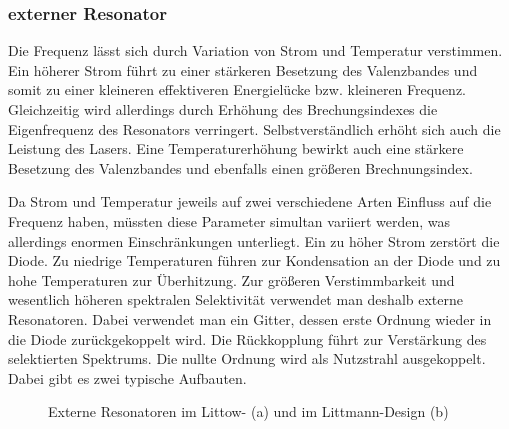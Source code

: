 \subsubsection{externer Resonator}\label{subsubsec:externer_resonator}
Die Frequenz lässt sich durch Variation von Strom und Temperatur verstimmen. Ein
höherer Strom führt zu einer stärkeren Besetzung des Valenzbandes und somit zu
einer kleineren effektiveren Energielücke bzw. kleineren Frequenz. Gleichzeitig
wird allerdings durch Erhöhung des Brechungsindexes die Eigenfrequenz des
Resonators verringert. Selbstverständlich erhöht sich auch die Leistung des
Lasers. Eine Temperaturerhöhung bewirkt auch eine stärkere Besetzung des
Valenzbandes und ebenfalls einen größeren Brechnungsindex.\par
Da Strom und Temperatur jeweils auf zwei verschiedene Arten Einfluss auf die
Frequenz haben, müssten diese Parameter simultan variiert werden, was
allerdings enormen Einschränkungen unterliegt. Ein zu höher Strom zerstört die
Diode. Zu niedrige Temperaturen führen zur Kondensation an der Diode und zu hohe
Temperaturen zur Überhitzung. Zur größeren Verstimmbarkeit und wesentlich
höheren spektralen Selektivität verwendet man deshalb externe Resonatoren. Dabei
verwendet man ein Gitter, dessen erste Ordnung wieder in die Diode
zurückgekoppelt wird. Die Rückkopplung führt zur Verstärkung des selektierten Spektrums. Die
nullte Ordnung wird als Nutzstrahl ausgekoppelt. Dabei gibt es zwei typische
Aufbauten.\par
\begin{figure}[h]
 	\centering
	\caption[externe Resonatoren - Aufbau]{Externe Resonatoren im Littow- (a) und
	im Littmann-Design (b)}\label{fig:externe_resonatoren_aufbau}
\end{figure}

